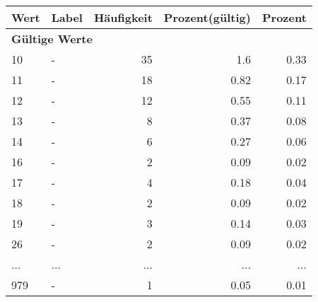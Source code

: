      \begin{longtable}{lXrrr}
     \toprule
     \textbf{Wert} & \textbf{Label} & \textbf{Häufigkeit} & \textbf{Prozent(gültig)} & \textbf{Prozent} \\
     \endhead
     \midrule
     \multicolumn{5}{l}{\textbf{Gültige Werte}}\\
        10 & \multicolumn{1}{X}{-} & %
          \num{35} &
          \num[round-mode=places,round-precision=2]{1.6} &
          \num[round-mode=places,round-precision=2]{0.33} \\
        11 & \multicolumn{1}{X}{-} & %
          \num{18} &
          \num[round-mode=places,round-precision=2]{0.82} &
          \num[round-mode=places,round-precision=2]{0.17} \\
        12 & \multicolumn{1}{X}{-} & %
          \num{12} &
          \num[round-mode=places,round-precision=2]{0.55} &
          \num[round-mode=places,round-precision=2]{0.11} \\
        13 & \multicolumn{1}{X}{-} & %
          \num{8} &
          \num[round-mode=places,round-precision=2]{0.37} &
          \num[round-mode=places,round-precision=2]{0.08} \\
        14 & \multicolumn{1}{X}{-} & %
          \num{6} &
          \num[round-mode=places,round-precision=2]{0.27} &
          \num[round-mode=places,round-precision=2]{0.06} \\
        16 & \multicolumn{1}{X}{-} & %
          \num{2} &
          \num[round-mode=places,round-precision=2]{0.09} &
          \num[round-mode=places,round-precision=2]{0.02} \\
        17 & \multicolumn{1}{X}{-} & %
          \num{4} &
          \num[round-mode=places,round-precision=2]{0.18} &
          \num[round-mode=places,round-precision=2]{0.04} \\
        18 & \multicolumn{1}{X}{-} & %
          \num{2} &
          \num[round-mode=places,round-precision=2]{0.09} &
          \num[round-mode=places,round-precision=2]{0.02} \\
        19 & \multicolumn{1}{X}{-} & %
          \num{3} &
          \num[round-mode=places,round-precision=2]{0.14} &
          \num[round-mode=places,round-precision=2]{0.03} \\
        26 & \multicolumn{1}{X}{-} & %
          \num{2} &
          \num[round-mode=places,round-precision=2]{0.09} &
          \num[round-mode=places,round-precision=2]{0.02} \\
       ... & ... & ... & ... & ... \\
        979 & \multicolumn{1}{X}{-} & %
          \num{1} &
          \num[round-mode=places,round-precision=2]{0.05} &
          \num[round-mode=places,round-precision=2]{0.01} \\


\end{longtable}
